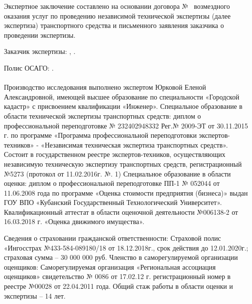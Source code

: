 \setcounter{page}{1}

Экспертное заключение составлено на основании	договора № \NomerDoc\,  возмездного оказания услуг по проведению независимой технической экспертизы (далее экспертиза)  транспортного средства и письменного заявления заказчика о проведении экспертизы.

Заказчик  экспертизы: , . 

Полис ОСАГО: \polis.



\paragraph*{}
  Производство исследования выполнено экспертом   Юрковой Еленой Александровной, имеющей высшее образование по специальности «Городской кадастр» с присвоением квалификации «Инженер». Специальное образование в области технической экспертизы транспортных средств: диплом о профессиональной переподготовке № 232402948332 Рег.№ 2009-ЭТ от 30.11.2015 г. по программе «Программа профессиональной переподготовки экспертов-техников» -  «Независимая техническая экспертиза транспортных средств». Состоит в государственном реестре экспертов-техников, осуществляющих независимую техническую экспертизу транспортных средств, регистрационный №5273 (протокол от 11.02.2016г. №. 1)  Специальное образование в области оценки: диплом о профессиональной переподготовке ПП-1 № 052044 от 11.06.2008 года  по программе «Оценка стоимости предприятия (бизнеса)» выдан ГОУ ВПО «Кубанский Государственный Технологический Университет». Квалификационный аттестат в области оценочной деятельности №006138-2 от 16.03.2018 г. «Оценка движимого имущества».        

Сведения о страховании гражданской ответственности: Страховой полис «Ингосстрах №433-584-089180/18 от 18.12.2018г., срок действия до 12.01.2020г.; страховая сумма – 30 000 000 руб.
Членство в саморегулируемой организации оценщиков:  Саморегулируемая организация «Региональная ассоциация оценщиков»  свидетельство № 0086 от 17.02.12 г. регистрационный номер в реестре №00028 от 22.04.2011 года.
Общий стаж работы в области оценки и экспертизы – 14 лет.

